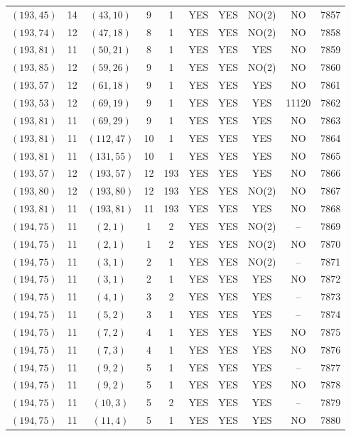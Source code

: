 \begin{longtable}{|c|c|c|c|c|c|c|c|c|c|}
$(193, 45)$ & 14 & $(43, 10)$ & 9 & 1 & YES & YES & NO(2) & NO & 7857\\
$(193, 74)$ & 12 & $(47, 18)$ & 8 & 1 & YES & YES & NO(2) & NO & 7858\\
$(193, 81)$ & 11 & $(50, 21)$ & 8 & 1 & YES & YES & YES & NO & 7859\\
$(193, 85)$ & 12 & $(59, 26)$ & 9 & 1 & YES & YES & NO(2) & NO & 7860\\
$(193, 57)$ & 12 & $(61, 18)$ & 9 & 1 & YES & YES & YES & NO & 7861\\
$(193, 53)$ & 12 & $(69, 19)$ & 9 & 1 & YES & YES & YES & 11120 & 7862\\
$(193, 81)$ & 11 & $(69, 29)$ & 9 & 1 & YES & YES & YES & NO & 7863\\
$(193, 81)$ & 11 & $(112, 47)$ & 10 & 1 & YES & YES & YES & NO & 7864\\
$(193, 81)$ & 11 & $(131, 55)$ & 10 & 1 & YES & YES & YES & NO & 7865\\
$(193, 57)$ & 12 & $(193, 57)$ & 12 & 193 & YES & YES & YES & NO & 7866\\
$(193, 80)$ & 12 & $(193, 80)$ & 12 & 193 & YES & YES & NO(2) & NO & 7867\\
$(193, 81)$ & 11 & $(193, 81)$ & 11 & 193 & YES & YES & YES & NO & 7868\\
$(194, 75)$ & 11 & $(2, 1)$ & 1 & 2 & YES & YES & NO(2) & -- & 7869\\
$(194, 75)$ & 11 & $(2, 1)$ & 1 & 2 & YES & YES & NO(2) & NO & 7870\\
$(194, 75)$ & 11 & $(3, 1)$ & 2 & 1 & YES & YES & NO(2) & -- & 7871\\
$(194, 75)$ & 11 & $(3, 1)$ & 2 & 1 & YES & YES & YES & NO & 7872\\
$(194, 75)$ & 11 & $(4, 1)$ & 3 & 2 & YES & YES & YES & -- & 7873\\
$(194, 75)$ & 11 & $(5, 2)$ & 3 & 1 & YES & YES & YES & -- & 7874\\
$(194, 75)$ & 11 & $(7, 2)$ & 4 & 1 & YES & YES & YES & NO & 7875\\
$(194, 75)$ & 11 & $(7, 3)$ & 4 & 1 & YES & YES & YES & NO & 7876\\
$(194, 75)$ & 11 & $(9, 2)$ & 5 & 1 & YES & YES & YES & -- & 7877\\
$(194, 75)$ & 11 & $(9, 2)$ & 5 & 1 & YES & YES & YES & NO & 7878\\
$(194, 75)$ & 11 & $(10, 3)$ & 5 & 2 & YES & YES & YES & -- & 7879\\
$(194, 75)$ & 11 & $(11, 4)$ & 5 & 1 & YES & YES & YES & NO & 7880\\

\end{longtable}
